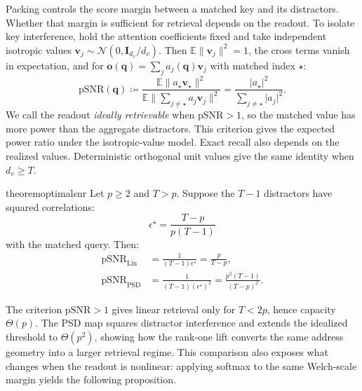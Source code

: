\documentclass{article}
\newcommand{\1}{\bm{1}}
\newcommand{\defeq}{\coloneqq}
\newcommand{\norm}[1]{\lVert {#1} \rVert}
\def\eps{{\epsilon}}
\def\vo{{\bm{o}}}
\def\vq{{\bm{q}}}
\def\vv{{\bm{v}}}
\def\mI{{\bm{I}}}
\def\gN{{\mathcal{N}}}
\theoremstyle{definition}
\begin{document}
Packing controls the score margin between a matched key and its distractors. Whether that margin is
sufficient for retrieval depends on the readout. To isolate key interference, hold the attention
coefficients fixed and take independent isotropic values
$\vv_j\sim\gN(0,\mI_{d_v}/d_v)$. Then $\mathbb{E}\norm{\vv_j}^2=1$, the cross terms vanish in expectation, and for
$\vo(\vq)=\sum_j a_j(\vq)\vv_j$ with matched index $\star$:
\begin{equation}
  \mathrm{pSNR}(\vq)
    \defeq
    \frac{\mathbb{E}\norm{a_\star\vv_\star}^2}
    {\mathbb{E}\norm{\sum_{j\ne\star}a_j\vv_j}^2}
    =\frac{\lvert a_\star\rvert^2}
    {\sum_{j\ne\star}\lvert a_j\rvert^2}.
  \label{eq:psnr-definition}
\end{equation}
We call the readout \emph{ideally retrievable} when $\mathrm{pSNR}>1$, so the matched value has more
power than the aggregate distractors. This criterion gives the expected power ratio under the isotropic-value model. Exact recall also
depends on the realized values. Deterministic orthogonal unit values give the same identity
when $d_v\ge T$.


\begin{restatable}{theorem}{optimalsnr}
  \label{thm:snr}
  Let $p\ge2$ and $T>p$. Suppose the $T-1$ distractors have squared correlations:
  \[
    \eps^\star=\frac{T-p}{p(T-1)}
  \]
  with the matched query. Then:
  \begin{align}
    \mathrm{pSNR}_{\mathrm{Lin}}
      &=\frac{1}{(T-1)\eps^\star}
       =\frac{p}{T-p}, \\
    \mathrm{pSNR}_{\mathrm{PSD}}
      &=\frac{1}{(T-1)(\eps^\star)^2}
       =\frac{p^2(T-1)}{(T-p)^2}.
  \end{align}
\end{restatable}

The criterion $\mathrm{pSNR}>1$ gives linear retrieval only for $T<2p$, hence capacity
$\Theta(p)$. The PSD map squares distractor interference and extends the idealized threshold to
$\Theta(p^2)$, showing how the rank-one lift converts the same address geometry into a larger
retrieval regime. This comparison also exposes what changes when the readout is nonlinear:
applying softmax to the same Welch-scale margin yields the following proposition.
\end{document}
